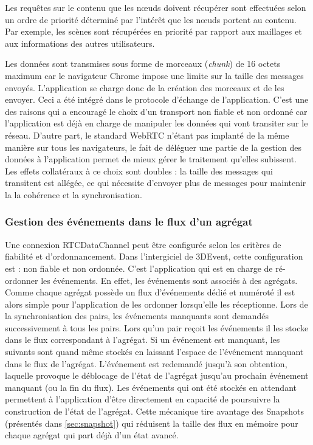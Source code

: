 Les requêtes sur le contenu que les n\oe uds doivent récupérer sont effectuées selon 
un ordre de priorité déterminé par l'intérêt que les n\oe uds portent au contenu. Par exemple, 
les scènes sont récupérées en priorité par rapport aux maillages et aux 
informations des autres utilisateurs. 

Les données sont transmises sous forme de morceaux (\textit{chunk}) de 16 
octets maximum car le navigateur Chrome impose une limite sur la taille des messages 
envoyés. L'application se charge donc de la création des morceaux et de les 
envoyer. Ceci a été intégré dans le protocole d'échange de l'application. C'est une 
des raisons qui a encouragé le choix d'un transport non fiable et non ordonné car 
l'application est déjà en charge de manipuler les données qui vont transiter sur le 
réseau. D'autre part, le standard WebRTC n'étant pas implanté de la même 
manière sur tous les navigateurs, le fait de déléguer une partie de la gestion des 
données à l'application permet de mieux gérer le traitement qu'elles subissent. Les 
effets collatéraux à ce choix sont doubles : la taille des messages qui transitent 
est allégée, ce qui nécessite d'envoyer plus de messages pour maintenir la 
 la cohérence et la synchronisation.


\subsubsection{Gestion des événements dans le flux d'un agrégat}

Une connexion RTCDataChannel peut être configurée selon 
les critères de fiabilité et d'ordonnancement. 
Dans l'intergiciel de 3DEvent, cette configuration est : non fiable et non ordonnée. 
C'est l'application qui est en charge de \og ré-ordonner\fg{} les événements. En 
effet, les événements sont associés à des agrégats. Comme chaque agrégat 
possède un flux d'événements dédié et numéroté il est alors simple pour 
l'application de les 
ordonner lorsqu'elle les réceptionne. 
Lors de la synchronisation des pairs, les 
événements manquants sont demandés successivement à tous les pairs. Lors 
qu'un pair reçoit les événements il les stocke dans le flux correspondant à 
l'agrégat. Si un événement est manquant, les suivants sont quand même stockés 
en laissant l'espace de l'événement manquant dans le flux de l'agrégat. L'événement est 
redemandé jusqu'à son obtention, laquelle provoque le déblocage de l'état de 
l'agrégat jusqu'au prochain événement manquant (ou la fin du flux). Les 
événements qui ont été stockés \og en attendant\fg{} permettent à l'application 
d'être directement en capacité de poursuivre la construction de l'état de l'agrégat. 
Cette mécanique tire avantage des Snapshots (présentés dans \ref{sec:snapshot}) 
qui réduisent la taille des flux en mémoire pour chaque agrégat qui part déjà d'un 
état avancé.


